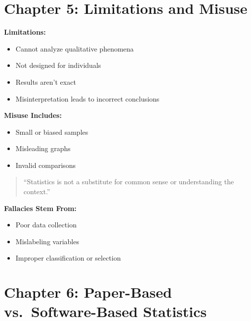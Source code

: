 \documentclass[
  letterpaper,
  DIV=11,
  numbers=noendperiod]{scrreprt}
\providecommand{\tightlist}{%
  \setlength{\itemsep}{0pt}\setlength{\parskip}{0pt}}
\begin{document}

\chapter{Chapter 5: Limitations and
Misuse}\label{chapter-5-limitations-and-misuse}

\textbf{Limitations:}

\begin{itemize}
\tightlist
\item
  Cannot analyze qualitative phenomena\\
\item
  Not designed for individuals\\
\item
  Results aren't exact\\
\item
  Misinterpretation leads to incorrect conclusions
\end{itemize}

\textbf{Misuse Includes:}

\begin{itemize}
\tightlist
\item
  Small or biased samples\\
\item
  Misleading graphs\\
\item
  Invalid comparisons
\end{itemize}

\begin{quote}
``Statistics is not a substitute for common sense or understanding the
context.''
\end{quote}

\textbf{Fallacies Stem From:}

\begin{itemize}
\tightlist
\item
  Poor data collection\\
\item
  Mislabeling variables\\
\item
  Improper classification or selection
\end{itemize}


\chapter{Chapter 6: Paper-Based vs.~Software-Based
Statistics}\label{chapter-6-paper-based-vs.-software-based-statistics}
\end{document}
